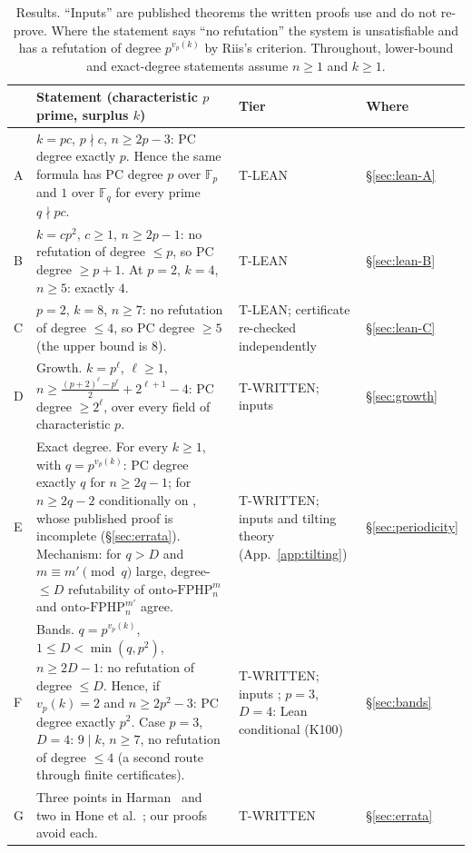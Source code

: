 \begin{table}[ht]
\centering\small
\renewcommand{\arraystretch}{1.25}
\begin{tabular}{@{}p{}p{}>{\raggedright\arraybackslash}p{}p{}@{}}
\toprule
 & Statement (characteristic $p$ prime, surplus $k$) & Tier & Where \\
\midrule
A & $k=pc$, $p\nmid c$, $n\ge2p-3$: PC degree exactly $p$.  Hence the same formula has PC
    degree $p$ over $\mathbb F_p$ and $1$ over $\mathbb F_q$ for every prime $q\nmid pc$.
  & T-LEAN & \S\ref{sec:lean-A} \\
B & $k=cp^2$, $c\ge1$, $n\ge2p-1$: no refutation of degree $\le p$, so PC degree
    $\ge p+1$.  At $p=2$, $k=4$, $n\ge5$: exactly $4$.
  & T-LEAN & \S\ref{sec:lean-B} \\
C & $p=2$, $k=8$, $n\ge7$: no refutation of degree $\le4$, so PC degree $\ge5$
    (the upper bound is $8$).
  & T-LEAN; certificate re-checked independently & \S\ref{sec:lean-C} \\
D & Growth.  $k=p^\ell$, $\ell\ge1$,
    $n\ge\frac{(p+2)^\ell-p^\ell}{2}+2^{\ell+1}-4$: PC degree $\ge2^\ell$, over every field of
    characteristic $p$.
  & T-WRITTEN; inputs \cite{churchellenberg,rhoades2024,beame1998counting} & \S\ref{sec:growth} \\
E & Exact degree.  For every $k\ge1$, with $q=p^{v_p(k)}$: PC degree exactly $q$ for
    $n\ge2q-1$; for $n\ge2q-2$ conditionally on \cite[Thm.~8.4.5]{hone2025}, whose
    published proof is incomplete (\S\ref{sec:errata}).  Mechanism: for $q>D$ and
    $m\equiv m'\pmod q$ large, degree-$\le D$ refutability of
    $\mathrm{onto\text{-}FPHP}^{m}_n$ and $\mathrm{onto\text{-}FPHP}^{m'}_n$ agree.
  & T-WRITTEN; inputs \cite{harman2015} and tilting theory (App.~\ref{app:tilting}) & \S\ref{sec:periodicity} \\
F & Bands.  $q=p^{v_p(k)}$, $1\le D<\min(q,p^2)$, $n\ge2D-1$: no refutation of degree
    $\le D$.  Hence, if $v_p(k)=2$ and $n\ge2p^2-3$: PC degree exactly $p^2$.
    Case $p=3$, $D=4$: $9\mid k$, $n\ge7$, no refutation of degree $\le4$ (a second
    route through finite certificates).
  & T-WRITTEN; inputs \cite{shareshianwachs,yalcin2016,miller2024};
    $p=3$, $D=4$: Lean conditional (K100) & \S\ref{sec:bands} \\
G & Three points in Harman~\cite{harman2015} and two in Hone et
    al.~\cite{hone2025}; our proofs avoid each.
  & T-WRITTEN & \S\ref{sec:errata} \\
\bottomrule
\end{tabular}
\caption{Results.  ``Inputs'' are published theorems the written proofs use and do not
re-prove.  Where the statement says ``no refutation'' the system is unsatisfiable and has a
refutation of degree $p^{v_p(k)}$ by Riis's criterion.  Throughout, lower-bound and
exact-degree statements assume $n\ge1$ and $k\ge1$.}
\label{tab:results}
\end{table}

